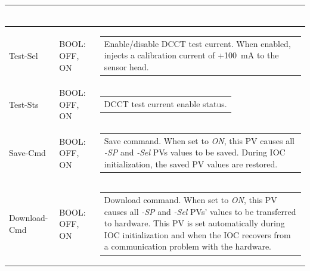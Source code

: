\documentclass[openany]{article}
\begin{document}
\begin{longtable}{| m{3.0cm} m{4.5cm} m{7.0cm} |}
\begin{tabular}{@{}m{6cm}@{}}
						\end{tabular} \\ \hline
		Test-Sel & BOOL: OFF, ON & \begin{tabular}{@{}m{6cm}@{}}
	    					Enable/disable DCCT test current. When enabled, injects a calibration current of +\SI{100}{\milli\ampere} to the sensor head.
						\end{tabular} \\ \hline
		Test-Sts & BOOL: OFF, ON & \begin{tabular}{@{}m{6cm}@{}}
 						DCCT test current enable status.
						\end{tabular} \\ \hline
		Save-Cmd & BOOL: OFF, ON & \begin{tabular}{@{}m{6cm}@{}}
 						Save command. When set to \emph{ON}, this PV causes all \emph{-SP} and \emph{-Sel} PVs values to be saved. During IOC initialization, the saved PV values are restored.
						\end{tabular} \\ \hline
		Download-Cmd & BOOL: OFF, ON & \begin{tabular}{@{}m{6cm}@{}}
 						Download command. When set to \emph{ON}, this PV causes all \emph{-SP} and \emph{-Sel} PVs' values to be transferred to hardware. This PV is set automatically during IOC initialization and when the IOC recovers from a communication problem with the hardware.
						\end{tabular} \\ \hline
	\end{longtable}
\end{document}
